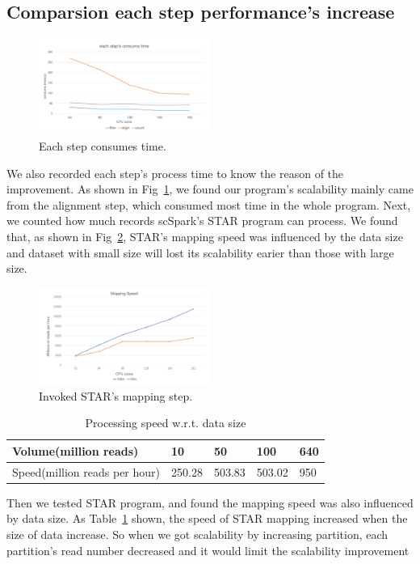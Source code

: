 \documentclass[10pt,journal,compsoc]{IEEEtran}
\begin{document}
\subsection{Comparsion each step performance's increase}
\begin{figure}
	\includegraphics[width=0.5\textwidth]{fig5.pdf}
	\caption{Each step consumes time.} \label{fig5}
\end{figure}
We also recorded each step's process time to know the reason of the improvement.
As shown in Fig~\ref{fig5}, we found our program's scalability mainly came from the alignment step, which consumed most time in the whole program.
Next, we counted how much records scSpark's STAR program can process.
We found that, as shown in Fig~\ref{fig6}, STAR's mapping speed was influenced by the data size and dataset with small size will lost its scalability earier than those with large size.
\begin{figure}
	\includegraphics[width=0.5\textwidth]{fig6.pdf}
	\caption{Invoked STAR's mapping step.} \label{fig6}
\end{figure}

\begin{table}
	\centering
	\caption{Processing speed w.r.t. data size}\label{tab3}
	\resizebox{0.45\textwidth}{!}
	{
	\begin{tabular}{l | l | l | l | l}
		\hline
		Volume(million reads) & 10 & 50 & 100 & 640 \\
		\hline
		Speed(million reads per hour) & 250.28 & 503.83 & 503.02 & 950 \\
		\hline
	\end{tabular}
	}
\end{table}

Then we tested STAR program, and found the mapping speed was also influenced by data size. 
As Table~\ref{tab3} shown, the speed of STAR mapping increased when the size of data increase. 
So when we got scalability by increasing partition, each partition's read number decreased and it would limit the scalability improvement
\end{document}
